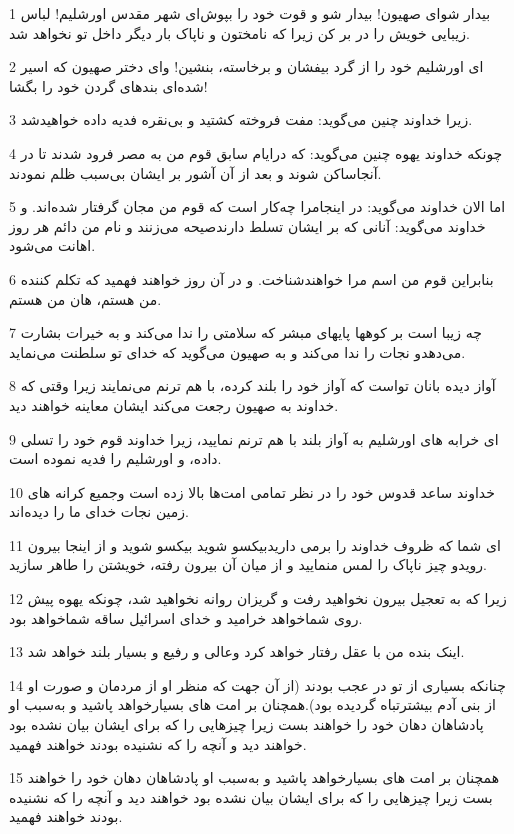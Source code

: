 \par 1 بیدار شو‌ای صهیون! بیدار شو و قوت خود را بپوش‌ای شهر مقدس اورشلیم! لباس زیبایی خویش را در بر کن زیرا که نامختون و ناپاک بار دیگر داخل تو نخواهد شد.
\par 2 ‌ای اورشلیم خود را از گرد بیفشان و برخاسته، بنشین! و‌ای دختر صهیون که اسیر شده‌ای بندهای گردن خود را بگشا!
\par 3 زیرا خداوند چنین می‌گوید: مفت فروخته کشتید و بی‌نقره فدیه داده خواهیدشد.
\par 4 چونکه خداوند یهوه چنین می‌گوید: که درایام سابق قوم من به مصر فرود شدند تا در آنجاساکن شوند و بعد از آن آشور بر ایشان بی‌سبب ظلم نمودند.
\par 5 اما الان خداوند می‌گوید: در اینجامرا چه‌کار است که قوم من مجان گرفتار شده‌اند. و خداوند می‌گوید: آنانی که بر ایشان تسلط دارندصیحه می‌زنند و نام من دائم هر روز اهانت می‌شود.
\par 6 بنابراین قوم من اسم مرا خواهندشناخت. و در آن روز خواهند فهمید که تکلم کننده من هستم، هان من هستم.
\par 7 چه زیبا است بر کوهها پایهای مبشر که سلامتی را ندا می‌کند و به خیرات بشارت می‌دهدو نجات را ندا می‌کند و به صهیون می‌گوید که خدای تو سلطنت می‌نماید.
\par 8 آواز دیده بانان تواست که آواز خود را بلند کرده، با هم ترنم می‌نمایند زیرا وقتی که خداوند به صهیون رجعت می‌کند ایشان معاینه خواهند دید.
\par 9 ‌ای خرابه های اورشلیم به آواز بلند با هم ترنم نمایید، زیرا خداوند قوم خود را تسلی داده، و اورشلیم را فدیه نموده است.
\par 10 خداوند ساعد قدوس خود را در نظر تمامی امت‌ها بالا زده است وجمیع کرانه های زمین نجات خدای ما را دیده‌اند.
\par 11 ‌ای شما که ظروف خداوند را برمی داریدبیکسو شوید بیکسو شوید و از اینجا بیرون رویدو چیز ناپاک را لمس منمایید و از میان آن بیرون رفته، خویشتن را طاهر سازید.
\par 12 زیرا که به تعجیل بیرون نخواهید رفت و گریزان روانه نخواهید شد، چونکه یهوه پیش روی شماخواهد خرامید و خدای اسرائیل ساقه شماخواهد بود.
\par 13 اینک بنده من با عقل رفتار خواهد کرد وعالی و رفیع و بسیار بلند خواهد شد.
\par 14 چنانکه بسیاری از تو در عجب بودند (از آن جهت که منظر او از مردمان و صورت او از بنی آدم بیشترتباه گردیده بود).همچنان بر امت های بسیارخواهد پاشید و به‌سبب او پادشاهان دهان خود را خواهند بست زیرا چیزهایی را که برای ایشان بیان نشده بود خواهند دید و آنچه را که نشنیده بودند خواهند فهمید.
\par 15 همچنان بر امت های بسیارخواهد پاشید و به‌سبب او پادشاهان دهان خود را خواهند بست زیرا چیزهایی را که برای ایشان بیان نشده بود خواهند دید و آنچه را که نشنیده بودند خواهند فهمید.
 
